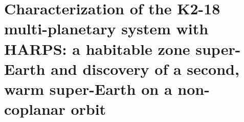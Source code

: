 \chapter[RV characterization of the K2-18 planetary system]{Characterization of the K2-18 multi-planetary system with HARPS: a habitable zone super-Earth and discovery of a second, warm super-Earth on a non-coplanar orbit}

